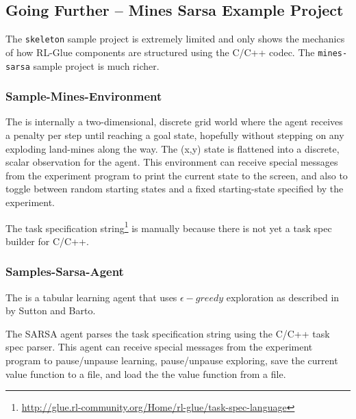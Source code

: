 \documentclass[11pt]{article}
\begin{document}
\subsection{Going Further -- Mines Sarsa Example Project}
\label{mines-sarsa-sample}
The \texttt{skeleton} sample project is extremely limited and only shows the mechanics of how RL-Glue components are structured using the C/C++ codec.  The \texttt{mines-sarsa} sample project is much richer.

\subsubsection{Sample-Mines-Environment}
\label{mines-sample}
The 
is internally a two-dimensional, discrete grid world where the agent receives a penalty per step until reaching a goal state, hopefully without stepping on any exploding land-mines along the way.  The (x,y) state is flattened into a discrete, scalar observation for the agent.  This environment can receive special messages from the experiment program to print the current state to the screen, and also to toggle between random starting states and a fixed starting-state specified by the experiment.

The task specification string\footnote{\url{http://glue.rl-community.org/Home/rl-glue/task-spec-language}} is manually because there is not yet a task spec builder for C/C++. 

\subsubsection{Samples-Sarsa-Agent}
\label{sarsa-sample}
The 
is a tabular learning agent that uses $\epsilon-greedy$ exploration as described in  by Sutton and Barto.

The SARSA agent parses the task specification string using the C/C++ task spec parser.  This agent can receive special messages from the experiment program to pause/unpause learning, pause/unpause exploring, save the current value function to a file, and load the the value function from a file.
\end{document}
